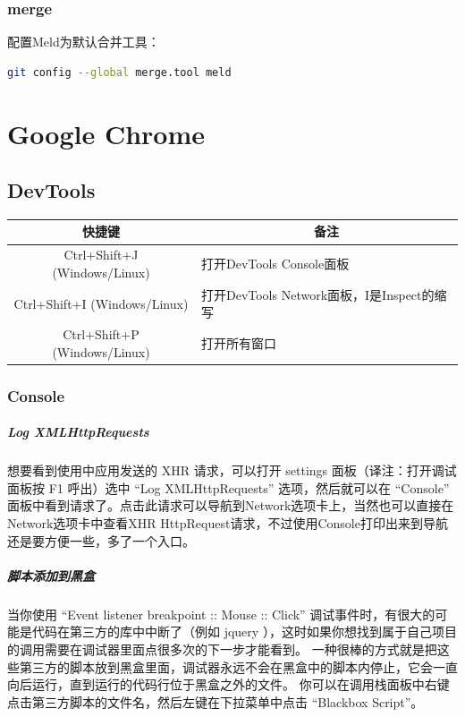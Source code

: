 \documentclass[letter]{book}
\begin{document}
\subsection{merge}

配置Meld为默认合并工具：

\begin{lstlisting}[language=Bash]
git config --global merge.tool meld
\end{lstlisting}

\chapter{Google Chrome}

\section{DevTools}

\begin{tabular}{|c|p{6cm}|}
	\hline
	\multirow{1}{*}{快捷键}
	& \multicolumn{1}{c|}{备注}\\			
	\hline
	Ctrl+Shift+J (Windows/Linux)  & 打开DevTools Console面板 \\
	\hline
	Ctrl+Shift+I (Windows/Linux)  & 打开DevTools Network面板，I是Inspect的缩写 \\
	\hline
	Ctrl+Shift+P (Windows/Linux)  & 打开所有窗口 \\
	\hline
\end{tabular}

\subsection{Console}

\paragraph{Log XMLHttpRequests}

想要看到使用中应用发送的 XHR 请求，可以打开 settings 面板（译注：打开调试面板按 F1 呼出）选中 “Log XMLHttpRequests” 选项，然后就可以在 “Console” 面板中看到请求了。点击此请求可以导航到Network选项卡上，当然也可以直接在Network选项卡中查看XHR HttpRequest请求，不过使用Console打印出来到导航还是要方便一些，多了一个入口。

\paragraph{脚本添加到黑盒}

当你使用 “Event listener breakpoint :: Mouse :: Click” 调试事件时，有很大的可能是代码在第三方的库中中断了（例如 jquery ），这时如果你想找到属于自己项目的调用需要在调试器里面点很多次的下一步才能看到。 一种很棒的方式就是把这些第三方的脚本放到黑盒里面，调试器永远不会在黑盒中的脚本内停止，它会一直向后运行，直到运行的代码行位于黑盒之外的文件。 你可以在调用栈面板中右键点击第三方脚本的文件名，然后左键在下拉菜单中点击 “Blackbox Script”。
\end{document}
